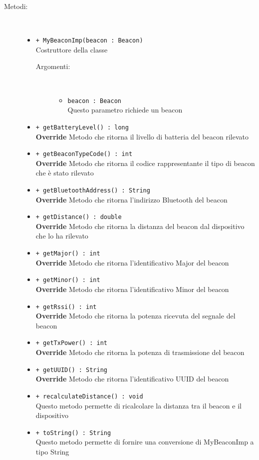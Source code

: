 \documentclass[../DefinizioneDiProdotto.tex]{subfiles}
\begin{document}
\begin{description}
\begin{itemize}
	\end{itemize}
	\item[Metodi:] \
	\begin{itemize}
		\item \texttt{+ MyBeaconImp(beacon : Beacon)}\\
		Costruttore della classe
		\begin{description}
			\item[Argomenti:] \
			\begin{itemize}
				\item \texttt{beacon : Beacon}\\
				Questo parametro richiede un beacon\end{itemize}
		\end{description}
		\item \texttt{+ getBatteryLevel() : long}\\
		\textbf{Override} Metodo che ritorna il livello di batteria del beacon rilevato
		\item \texttt{+ getBeaconTypeCode() : int}\\
		\textbf{Override} Metodo che ritorna il codice rappresentante il tipo di beacon che è stato rilevato
		\item \texttt{+ getBluetoothAddress() : String}\\
		\textbf{Override} Metodo che ritorna l'indirizzo Bluetooth del beacon
		\item \texttt{+ getDistance() : double}\\
		\textbf{Override} Metodo che ritorna la distanza del beacon dal dispositivo che lo ha rilevato
		\item \texttt{+ getMajor() : int}\\
		\textbf{Override} Metodo che ritorna l'identificativo Major del beacon
		\item \texttt{+ getMinor() : int}\\
		\textbf{Override} Metodo che ritorna l'identificativo Minor del beacon
		\item \texttt{+ getRssi() : int}\\
		\textbf{Override} Metodo che ritorna la potenza ricevuta del segnale del beacon
		\item \texttt{+ getTxPower() : int}\\
		\textbf{Override} Metodo che ritorna la potenza di trasmissione del beacon
		\item \texttt{+ getUUID() : String}\\
		\textbf{Override} Metodo che ritorna l'identificativo UUID del beacon
		\item \texttt{+ recalculateDistance() : void}\\
		Questo metodo permette di ricalcolare la distanza tra il beacon e il dispositivo
		\item \texttt{+ toString() : String}\\
		Questo metodo permette di fornire una conversione di MyBeaconImp a tipo String
	\end{itemize}
\end{description}
\end{document}

